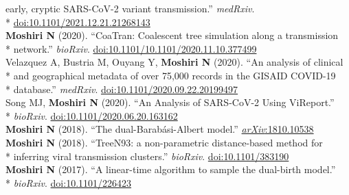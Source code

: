\documentclass[margin,line]{res}
\begin{document}
\begin{resume}
\hspace*{9mm} early, cryptic SARS-CoV-2 variant transmission.'' \textit{medRxiv}.\\*\vspace{2mm}
\hspace*{8mm} \href{https://doi.org/10.1101/2021.12.21.21268143}{doi:10.1101/2021.12.21.21268143}\\
\hspace*{4mm} \textbf{Moshiri N} (2020). ``CoaTran: Coalescent tree simulation along a transmission\\*\vspace{2mm}
\hspace*{8mm} network.'' \textit{bioRxiv}. \href{https://doi.org/10.1101/10.1101/2020.11.10.377499}{doi:10.1101/10.1101/2020.11.10.377499}\\
\hspace*{4mm} Velazquez A, Bustria M, Ouyang Y, \textbf{Moshiri N} (2020). ``An analysis of clinical\\*
\hspace*{9mm} and geographical metadata of over 75,000 records in the GISAID COVID-19\\*\vspace{2mm}
\hspace*{8mm} database.'' \textit{medRxiv}. \href{https://doi.org/10.1101/2020.09.22.20199497}{doi:10.1101/2020.09.22.20199497}\\
\hspace*{4mm} Song MJ, \textbf{Moshiri N} (2020). ``An Analysis of SARS-CoV-2 Using ViReport.''\\*\vspace{2mm}
\hspace*{8mm} \textit{bioRxiv}. \href{https://doi.org/10.1101/2020.06.20.163162}{doi:10.1101/2020.06.20.163162}\\
\hspace*{4mm} \vspace{2mm}\textbf{Moshiri N} (2018). ``The dual-Barab\'asi-Albert model.'' \href{https://arxiv.org/abs/1810.10538}{\textit{arXiv}:1810.10538}\\
\hspace*{4mm} \textbf{Moshiri N} (2018). ``TreeN93: a non-parametric distance-based method for\\*\vspace{2mm}
\hspace*{8mm} inferring viral transmission clusters.'' \textit{bioRxiv}. \href{https://doi.org/10.1101/383190}{doi:10.1101/383190}\\
\hspace*{4mm} \textbf{Moshiri N} (2017). ``A linear-time algorithm to sample the dual-birth model.''\\*\vspace{2mm}
\hspace*{8mm} \textit{bioRxiv}. \href{https://doi.org/10.1101/226423}{doi:10.1101/226423}\\


\end{resume}
\end{document}

